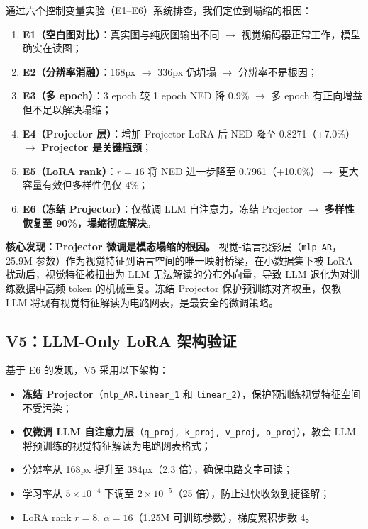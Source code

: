 通过六个控制变量实验（E1--E6）系统排查，我们定位到塌缩的根因：

\begin{enumerate}[nosep]
    \item \textbf{E1（空白图对比）}：真实图与纯灰图输出不同 $\to$ 视觉编码器正常工作，模型确实在读图；
    \item \textbf{E2（分辨率消融）}：168px $\to$ 336px 仍坍塌 $\to$ 分辨率不是根因；
    \item \textbf{E3（多 epoch）}：3 epoch 较 1 epoch NED 降 0.9\% $\to$ 多 epoch 有正向增益但不足以解决塌缩；
    \item \textbf{E4（Projector 层）}：增加 Projector LoRA 后 NED 降至 0.8271（+7.0\%）$\to$ \textbf{Projector 是关键瓶颈}；
    \item \textbf{E5（LoRA rank）}：$r=16$ 将 NED 进一步降至 0.7961（+10.0\%）$\to$ 更大容量有效但多样性仍仅 4\%；
    \item \textbf{E6（冻结 Projector）}：仅微调 LLM 自注意力，冻结 Projector $\to$ \textbf{多样性恢复至 90\%，塌缩彻底解决}。
\end{enumerate}

\textbf{核心发现：Projector 微调是模态塌缩的根因。} 视觉-语言投影层（\texttt{mlp\_AR}，25.9M 参数）作为视觉特征到语言空间的唯一映射桥梁，在小数据集下被 LoRA 扰动后，视觉特征被扭曲为 LLM 无法解读的分布外向量，导致 LLM 退化为对训练数据中高频 token 的机械重复。冻结 Projector 保护预训练对齐权重，仅教 LLM 将现有视觉特征解读为电路网表，是最安全的微调策略。

\subsection{V5：LLM-Only LoRA 架构验证}

基于 E6 的发现，V5 采用以下架构：

\begin{itemize}
    \item \textbf{冻结 Projector}（\texttt{mlp\_AR.linear\_1} 和 \texttt{linear\_2}），保护预训练视觉特征空间不受污染；
    \item \textbf{仅微调 LLM 自注意力层}（\texttt{q\_proj, k\_proj, v\_proj, o\_proj}），教会 LLM 将预训练的视觉特征解读为电路网表格式；
    \item 分辨率从 168px 提升至 384px（2.3 倍），确保电路文字可读；
    \item 学习率从 $5\times10^{-4}$ 下调至 $2\times10^{-5}$（25 倍），防止过快收敛到捷径解；
    \item LoRA rank $r=8$, $\alpha=16$（1.25M 可训练参数），梯度累积步数 4。
\end{itemize}

